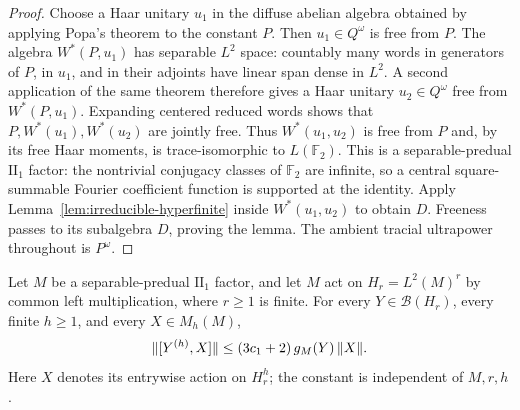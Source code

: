 \begin{proof}
Choose a Haar unitary \(u_1\) in the diffuse abelian algebra obtained
by applying Popa's theorem to the constant \(P\).  Then
\(u_1\in Q^\omega\) is free from \(P\).
The algebra \(W^*(P,u_1)\) has separable \(L^2\) space: countably
many words in generators of \(P\), in \(u_1\), and in their adjoints
have linear span dense in \(L^2\).
A second application of the same theorem therefore gives a Haar
unitary \(u_2\in Q^\omega\) free from \(W^*(P,u_1)\).
Expanding centered reduced words shows that
\(P,W^*(u_1),W^*(u_2)\) are jointly free.  Thus
\(W^*(u_1,u_2)\) is free from \(P\) and, by its free Haar moments,
is trace-isomorphic to \(L(\mathbb F_2)\).  This is a separable-predual
\(\mathrm{II}_1\) factor: the nontrivial conjugacy classes of
\(\mathbb F_2\) are infinite, so a central square-summable Fourier
coefficient function is supported at the identity.  Apply
Lemma~\ref{lem:irreducible-hyperfinite} inside \(W^*(u_1,u_2)\) to
obtain \(D\).  Freeness passes to its subalgebra \(D\), proving the
lemma.  The ambient tracial ultrapower throughout is \(P^\omega\).
\end{proof}

\begin{proposition}
\label{prop:finite-copies}
Let \(M\) be a separable-predual \(\mathrm{II}_1\) factor, and let
\(M\) act on \(H_r=L^2(M)^r\) by common left multiplication, where
\(r\geq1\) is finite.  For every \(Y\in\mathcal B(H_r)\), every
finite \(h\geq1\), and every \(X\in M_h(M)\),
\[
 \lVert[Y^{(h)},X]\rVert
       \leq (3c_1+2)\,g_M(Y)\,\lVert X\rVert.
\]
Here \(X\) denotes its entrywise action on \(H_r^h\); the constant
is independent of \(M,r,h\).
\end{proposition}

